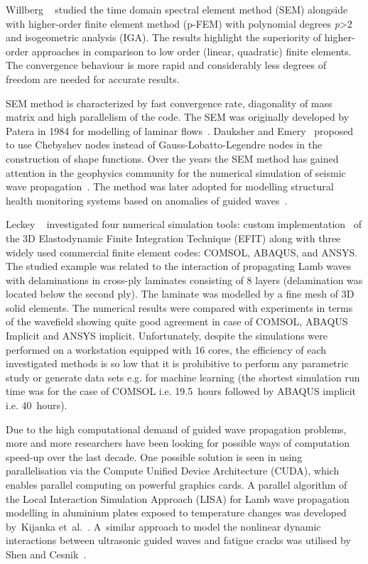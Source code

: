 \documentclass[12pt]{iopart}
\begin{document}
Willberg \etal~\cite{Willberg2012} studied the time domain spectral element method (SEM) alongside with higher-order finite element method (p-FEM) with polynomial degrees \emph{p}{\textgreater}2 and isogeometric analysis (IGA). The results highlight the superiority of higher-order approaches in comparison to low order (linear, quadratic) finite elements. The convergence behaviour is more rapid and considerably less degrees of freedom are needed for accurate results.

SEM method is characterized by fast convergence rate, diagonality of mass matrix and high parallelism of the code. The SEM was originally developed by Patera in 1984 for modelling of laminar flows~\cite{Patera1984}. Dauksher and Emery~\cite{Dauksher1997,Dauksher2000} proposed to use Chebyshev nodes instead of Gauss-Lobatto-Legendre nodes in the construction of shape functions. Over the years the SEM method has gained attention in the geophysics community for the numerical simulation of seismic wave propagation~\cite{Seriani1998,Komatitsch2009}. The method was later adopted for modelling structural health monitoring systems based on anomalies of guided waves~\cite{Schulte2010,Ostachowicz2012,Lonkar2013}. 

Leckey \etal~\cite{Leckey2018} investigated four numerical simulation tools: custom implementation~\cite{Leckey2014} of the 3D Elastodynamic Finite Integration Technique (EFIT) \cite{Schubert1998} along with three widely used commercial finite element codes: COMSOL, ABAQUS, and ANSYS. The studied example was related to the interaction of propagating Lamb waves with delaminations in cross-ply laminates consisting of 8 layers (delamination was located below the second ply). The laminate was modelled by a fine mesh of 3D solid elements. The numerical results were compared with experiments in terms of the wavefield showing quite good agreement in case of COMSOL, ABAQUS Implicit and ANSYS implicit. Unfortunately, despite the simulations were performed on a workstation equipped with 16 cores, the efficiency of each investigated methods is so low that it is prohibitive to perform any parametric study or generate data sets e.g. for machine learning (the shortest simulation run time was for the case of COMSOL i.e. 19.5~hours followed by ABAQUS implicit i.e. 40~hours).

Due to the high computational demand of guided wave propagation problems, more and more researchers have been looking for possible ways of computation speed-up over the last decade. One possible solution is seen in using parallelisation via the Compute Unified Device Architecture (CUDA), which enables parallel computing on powerful graphics cards. A parallel algorithm of the Local Interaction Simulation Approach (LISA) for Lamb wave propagation modelling in aluminium plates exposed to temperature changes was developed by~Kijanka et~al.~\cite{Kijanka2013}. A~similar approach to model the nonlinear dynamic interactions between ultrasonic guided waves and fatigue cracks was utilised by Shen and Cesnik~\cite{Shen2017}.  
\end{document}
